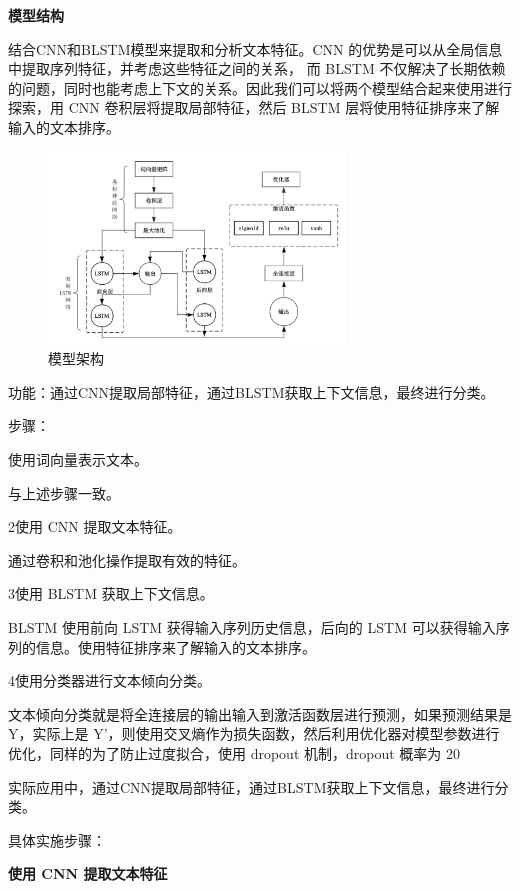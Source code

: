 \documentclass[UTF8,a4paper,15pt,titlepage,oneside]{ctexbook}
\begin{document}
\vskip 0.2cm
\noindent
\textbf{模型结构}

结合CNN和BLSTM模型来提取和分析文本特征。CNN 的优势是可以从全局信息中提取序列特征，并考虑这些特征之间的关系， 而 BLSTM 不仅解决了长期依赖的问题，同时也能考虑上下文的关系。因此我们可以将两个模型结合起来使用进行探索，用 CNN 卷积层将提取局部特征，然后 BLSTM 层将使用特征排序来了解输入的文本排序。

\begin{figure}[H]
  \centering
  \includegraphics[width=0.7\textwidth,keepaspectratio=false]{pictures/9.png} %
  \caption{模型架构}
\end{figure}

\noindent
功能：通过CNN提取局部特征，通过BLSTM获取上下文信息，最终进行分类。

\noindent
步骤： 

 使用词向量表示文本。

与上述步骤一致。

\noindent
2使用 CNN 提取文本特征。

通过卷积和池化操作提取有效的特征。

\noindent
3使用 BLSTM 获取上下文信息。

BLSTM 使用前向 LSTM 获得输入序列历史信息，后向的 LSTM 可以获得输入序列的信息。使用特征排序来了解输入的文本排序。

\noindent
4使用分类器进行文本倾向分类。

文本倾向分类就是将全连接层的输出输入到激活函数层进行预测，如果预测结果是 Y，实际上是 Y’，则使用交叉熵作为损失函数，然后利用优化器对模型参数进行优化，同样的为了防止过度拟合，使用 dropout 机制，dropout 概率为 20%



实际应用中，通过CNN提取局部特征，通过BLSTM获取上下文信息，最终进行分类。

具体实施步骤：


\vskip 0.2cm
\noindent
\textbf{使用 CNN 提取文本特征}
\end{document}
